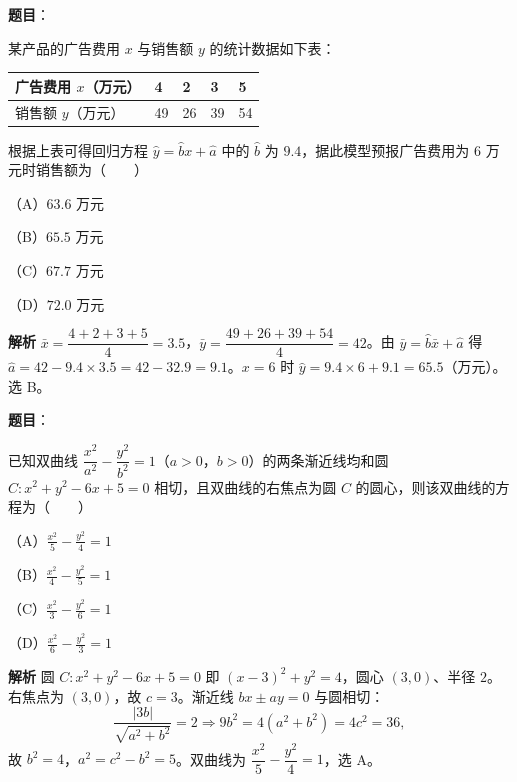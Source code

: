\begin{answer}

\textbf{题目}：

某产品的广告费用 $x$ 与销售额 $y$ 的统计数据如下表：

\begin{center}
\begin{tabular}{lllll}
\toprule
广告费用 $x$（万元） & 4 & 2 & 3 & 5 \\
\midrule
销售额 $y$（万元） & 49 & 26 & 39 & 54 \\
\bottomrule
\end{tabular}
\end{center}

根据上表可得回归方程 $\hat y=\hat bx+\hat a$ 中的 $\hat b$ 为 $9.4$，据此模型预报广告费用为 $6$ 万元时销售额为\mbox{（　　）}

（A）$63.6$ 万元

（B）$65.5$ 万元

（C）$67.7$ 万元

（D）$72.0$ 万元

\textbf{解析}
$\bar x=\dfrac{4+2+3+5}{4}=3.5$，$\bar y=\dfrac{49+26+39+54}{4}=42$。由 $\bar y=\hat b\bar x+\hat a$ 得 $\hat a=42-9.4\times3.5=42-32.9=9.1$。$x=6$ 时 $\hat y=9.4\times6+9.1=65.5$（万元）。选 B。


\end{answer}
\begin{answer}

\textbf{题目}：

已知双曲线 $\dfrac{x^2}{a^2}-\dfrac{y^2}{b^2}=1$（$a>0$，$b>0$）的两条渐近线均和圆 $C:x^2+y^2-6x+5=0$ 相切，且双曲线的右焦点为圆 $C$ 的圆心，则该双曲线的方程为\mbox{（　　）}

（A）$\frac{x^2}{5}-\frac{y^2}{4}=1$

（B）$\frac{x^2}{4}-\frac{y^2}{5}=1$

（C）$\frac{x^2}{3}-\frac{y^2}{6}=1$

（D）$\frac{x^2}{6}-\frac{y^2}{3}=1$

\textbf{解析}
圆 $C:x^2+y^2-6x+5=0$ 即 $(x-3)^2+y^2=4$，圆心 $(3,0)$、半径 $2$。右焦点为 $(3,0)$，故 $c=3$。渐近线 $bx\pm ay=0$ 与圆相切：
\nopagebreak[4]
\[\frac{|3b|}{\sqrt{a^2+b^2}}=2\Longrightarrow 9b^2=4(a^2+b^2)=4c^2=36,\]
故 $b^2=4$，$a^2=c^2-b^2=5$。双曲线为 $\dfrac{x^2}{5}-\dfrac{y^2}{4}=1$，选 A。


\end{answer}
